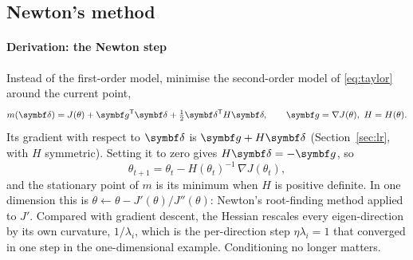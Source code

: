 \documentclass[11pt]{article}
\newcommand{\gvec}{\vect{g}}
\newcommand{\dvec}{\vect{\delta}}
\begin{document}
\subsection{Newton's method}\label{sec:newton}

\paragraph{Derivation: the Newton step} Instead of the first-order model, minimise the second-order model of
\eqref{eq:taylor} around the current point,
\[
  m(\dvec) = J(\theta) + \gvec\T\dvec + \tfrac12\dvec\T H\dvec, \qquad \gvec = \nabla J(\theta),\ H = H(\theta).
\]
Its gradient with respect to $\dvec$ is $\gvec + H\dvec$ (Section~\ref{sec:lr}, with $H$ symmetric). Setting it to
zero gives $H\dvec = -\gvec$, so
\[
  \theta_{t+1} = \theta_t - H(\theta_t)^{-1}\,\nabla J(\theta_t) ,
\]
and the stationary point of $m$ is its minimum when $H$ is positive definite. In one dimension this is
$\theta \leftarrow \theta - J'(\theta)/J''(\theta)$: Newton's root-finding method applied to $J'$. Compared with
gradient descent, the Hessian rescales every eigen-direction by its own curvature, $1/\lambda_i$, which is the
per-direction step $\eta\lambda_i = 1$ that converged in one step in the one-dimensional example. Conditioning no
longer matters.
\end{document}
